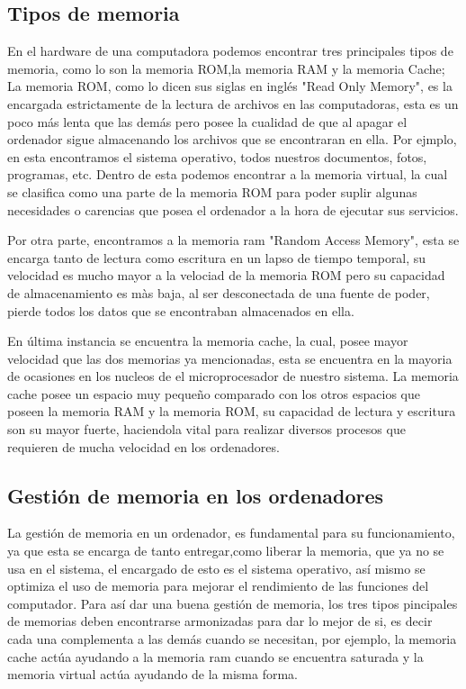 \documentclass{article}
\begin{document}
\subsection{Tipos de memoria}
En el hardware de una computadora podemos encontrar tres principales tipos de memoria, como lo son la memoria ROM,la memoria RAM y la memoria Cache; La memoria ROM, como lo dicen sus siglas en inglés "Read Only Memory", es la encargada estrictamente de la lectura de archivos en las computadoras, esta es un poco más lenta que las demás pero posee la cualidad de que al apagar el ordenador sigue almacenando los archivos que se encontraran en ella. Por ejmplo, en esta encontramos el sistema operativo, todos nuestros documentos, fotos, programas, etc. Dentro de esta podemos encontrar a la memoria virtual, la cual se clasifica como una parte de la memoria ROM para poder suplir algunas necesidades o carencias que posea el ordenador a la hora de ejecutar sus servicios.

 Por otra parte, encontramos a la memoria ram "Random Access Memory", esta se encarga tanto de lectura como escritura en un lapso de tiempo temporal, su velocidad es mucho mayor a la velociad de la memoria ROM pero su capacidad de almacenamiento es màs baja, al ser desconectada de una fuente de poder, pierde todos los datos que se encontraban almacenados en ella.
 
En última instancia se encuentra la memoria cache, la cual, posee mayor velocidad que las dos memorias ya mencionadas, esta se encuentra en la mayoria de ocasiones en los nucleos de el microprocesador de nuestro sistema. La memoria cache posee un espacio muy pequeño comparado con los otros espacios que poseen la memoria RAM y la memoria ROM, su capacidad de lectura y escritura son su mayor fuerte, haciendola vital para realizar diversos procesos que requieren de mucha velocidad en los ordenadores.

\subsection{Gestión de memoria en los ordenadores} 
La gestión de memoria en un ordenador, es fundamental para su funcionamiento, ya que esta se encarga de tanto entregar,como liberar la memoria, que ya no se usa en el sistema, el encargado de esto es el sistema operativo, así mismo se optimiza el uso de memoria para mejorar el rendimiento de las funciones del computador. Para así dar una buena gestión de memoria, los tres tipos pincipales de memorias deben encontrarse armonizadas para dar lo mejor de si, es decir cada una complementa a las demás cuando se necesitan, por ejemplo, la memoria cache actúa ayudando a la memoria ram cuando se encuentra saturada y la memoria virtual actúa ayudando de la misma forma.
\end{document}
